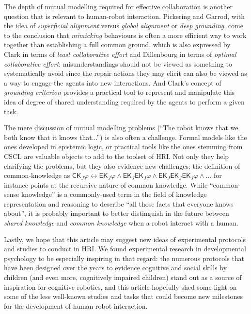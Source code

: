 \documentclass{sig-alternate}
\begin{document}
The depth of mutual modelling required for effective collaboration is another
question that is relevant to human-robot interaction. Pickering and Garrod, with
the idea of \emph{superficial alignment} versus \emph{global alignment} or
\emph{deep grounding}, come to the conclusion that \emph{mimicking} behaviours
is often a more efficient way to work together than establishing a full common
ground, which is also expressed by Clark in terms of \emph{least collaborative
effort} and Dillenbourg in terms of \emph{optimal collaborative effort}:
misunderstandings should not be viewed as something to systematically avoid
since the repair actions they may elicit can also be viewed as a way to engage
the agents into new interactions. And Clark's concept of \emph{grounding
criterion} provides a practical tool to represent and manipulate this idea of
degree of shared understanding required by the agents to perform a given task.



The mere discussion of mutual modelling problems (``The robot knows that we both
know that it knows that...'') is also often a challenge. Formal models like the
ones developed in epistemic logic, or practical tools like the ones stemming
from CSCL are valuable objects to add to the toolset of HRI. Not only they help
clarifying the problems, but they also evidence new challenges: the definition
of common-knowledge as $\mathsf{CK}_J\varphi \leftrightarrow
\mathsf{EK}_J\varphi \wedge \mathsf{EK}_J\mathsf{EK}_J\varphi \wedge
\mathsf{EK}_J\mathsf{EK}_J\mathsf{EK}_J\varphi \wedge ...$ for instance points
at the recursive nature of common knowledge. While ``common-sense knowledge'' is
a commonly-used term in the field of knowledge representation and reasoning to
describe ``all those facts that everyone knows about'', it is probably important
to better distinguish in the future between \emph{shared knowledge} and
\emph{common knowledge} when a robot interact with a human.

Lastly, we hope that this article may suggest new ideas of experimental
protocols and studies to conduct in HRI. We found experimental research in
developmental psychology to be especially inspiring in that regard: the numerous
protocols that have been designed over the years to evidence cognitive and
social skills by children (and even more, cognitively impaired children) stand
out as a source of inspiration for cognitive robotics,
and this article hopefully shed some light on some of the less well-known
studies and tasks that could become new milestones for the development of
human-robot interaction.
\end{document}
